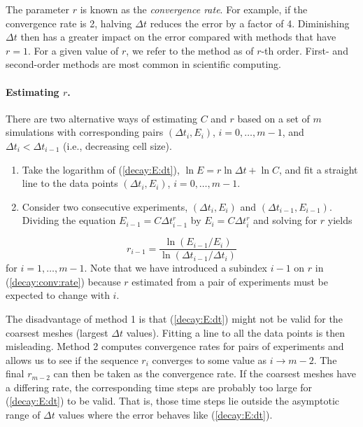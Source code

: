 \documentclass[%
oneside,                 %
final,                   %
10pt]{article}
\begin{document}
The parameter $r$ is known as the \emph{convergence rate}. For example,
if the convergence rate is 2, halving $\Delta t$ reduces the error by
a factor of 4. Diminishing $\Delta t$ then has a greater impact on
the error compared with methods that have $r=1$. For a given value of $r$,
we refer to the method as of $r$-th order. First- and second-order
methods are most common in scientific computing.

\paragraph{Estimating $r$.}
There are two alternative ways of estimating $C$ and $r$ based on a set of
$m$ simulations with corresponding pairs $(\Delta t_i, E_i)$, $i=0,\ldots,m-1$,
and $\Delta t_{i} < \Delta t_{i-1}$ (i.e., decreasing cell size).

\begin{enumerate}
 \item Take the logarithm of (\ref{decay:E:dt}), $\ln E = r\ln \Delta t + \ln C$,
    and fit a straight line to the data points $(\Delta t_i, E_i)$,
    $i=0,\ldots,m-1$.

 \item Consider two consecutive experiments, $(\Delta t_i, E_i)$ and
    $(\Delta t_{i-1}, E_{i-1})$. Dividing the equation
    $E_{i-1}=C\Delta t_{i-1}^r$ by $E_{i}=C\Delta t_{i}^r$ and solving
    for $r$ yields
\end{enumerate}

\noindent
\begin{equation}
r_{i-1} = \frac{\ln (E_{i-1}/E_i)}{\ln (\Delta t_{i-1}/\Delta t_i)}
\label{decay:conv:rate}
\end{equation}
for $i=1,\ldots,m-1$. Note that we have introduced a subindex $i-1$
on $r$ in (\ref{decay:conv:rate}) because $r$ estimated from
a pair of experiments must be expected to change with $i$.

The disadvantage of method 1 is that (\ref{decay:E:dt}) might not be valid
for the coarsest meshes (largest $\Delta t$ values). Fitting a line
to all the data points is then misleading.  Method 2 computes
convergence rates for pairs of experiments and allows us to see
if the sequence $r_i$ converges to some value as $i\rightarrow m-2$.
The final $r_{m-2}$ can then be taken as the convergence rate.
If the coarsest meshes have a differing rate, the corresponding
time steps are probably too large for (\ref{decay:E:dt}) to be valid.
That is, those time steps lie outside the asymptotic range of
$\Delta t$ values where the error behaves like (\ref{decay:E:dt}).
\end{document}
